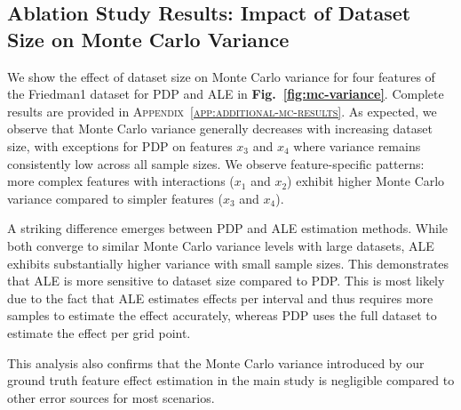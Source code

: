 \documentclass[runningheads]{llncs}
\begin{document}
\subsection{Ablation Study Results: Impact of Dataset Size on Monte Carlo Variance}\label{sec:results-dataset-size}

We show the effect of dataset size on Monte Carlo variance for four features
of the Friedman1 dataset for PDP and ALE in
\textbf{Fig.\@~\ref{fig:mc-variance}}. Complete results are provided in
\textsc{Appendix~\ref{app:additional-mc-results}}. As expected, we observe that
Monte Carlo variance generally decreases with increasing dataset size, with exceptions
for PDP on features $x_3$ and $x_4$ where variance remains consistently low across all sample sizes.
We observe feature-specific patterns: more complex features with interactions ($x_1$ and $x_2$)
exhibit higher Monte Carlo variance compared to simpler features ($x_3$ and $x_4$).

A striking difference emerges between PDP and ALE estimation methods. While both converge
to similar Monte Carlo variance levels with large datasets, ALE exhibits substantially
higher variance with small sample sizes. This
demonstrates that ALE is more sensitive to dataset size compared to PDP. This is  %
most likely due to the fact that ALE estimates effects per interval and thus
requires more samples to estimate the effect accurately, whereas PDP
uses the full dataset to estimate the effect per grid point.

This analysis also confirms that the Monte Carlo variance introduced by our ground truth
feature effect estimation in the main study is negligible compared to other error sources
for most scenarios.
\end{document}
